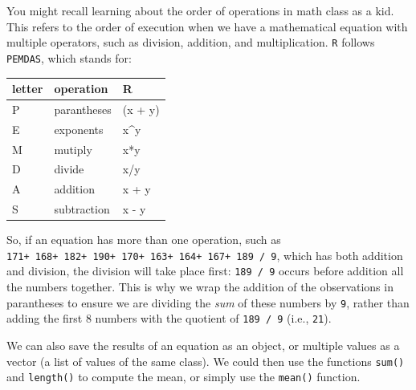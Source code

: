 \documentclass[
  letterpaper,
  DIV=11,
  numbers=noendperiod]{scrartcl}
\begin{document}
\begin{tcolorbox}[enhanced jigsaw, colframe=quarto-callout-tip-color-frame, rightrule=.15mm, breakable, coltitle=black, opacityback=0, leftrule=.75mm, colback=white, toprule=.15mm, opacitybacktitle=0.6, colbacktitle=quarto-callout-tip-color!10!white, bottomrule=.15mm, toptitle=1mm, left=2mm, titlerule=0mm, arc=.35mm, title=\textcolor{quarto-callout-tip-color}{\faLightbulb}\hspace{0.5em}{PEMDAS}, bottomtitle=1mm]

You might recall learning about the order of operations in math class as
a kid. This refers to the order of execution when we have a mathematical
equation with multiple operators, such as division, addition, and
multiplication. \texttt{R} follows \texttt{PEMDAS}, which stands for:

\begin{table}
\centering
\begin{tabular}{l|l|l}
\hline
letter & operation & R\\
\hline
P & parantheses & (x + y)\\
\hline
E & exponents & x\textasciicircum{}y\\
\hline
M & mutiply & x*y\\
\hline
D & divide & x/y\\
\hline
A & addition & x + y\\
\hline
S & subtraction & x - y\\
\hline
\end{tabular}
\end{table}

So, if an equation has more than one operation, such as
\texttt{171+\ 168+\ 182+\ 190+\ 170+\ 163+\ 164+\ 167+\ 189\ /\ 9},
which has both addition and division, the division will take place
first: \texttt{189\ /\ 9} occurs before addition all the numbers
together. This is why we wrap the addition of the observations in
parantheses to ensure we are dividing the \emph{sum} of these numbers by
\texttt{9}, rather than adding the first 8 numbers with the quotient of
\texttt{189\ /\ 9} (i.e., \texttt{21}).

\end{tcolorbox}

We can also save the results of an equation as an object, or multiple
values as a vector (a list of values of the same class). We could then
use the functions \texttt{sum()} and \texttt{length()} to compute the
mean, or simply use the \texttt{mean()} function.
\end{document}
